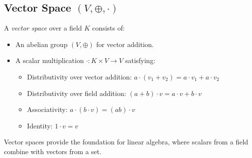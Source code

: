 \subsection{Vector Space \((V, \oplus, \cdot)\)}
A \emph{vector space} over a field \(K\) consists of:
\begin{itemize}[label=\(-\)]
  \item An abelian group \((V, \oplus)\) for vector addition.
  \item A scalar multiplication \(\cdot: K \times V \to V\) satisfying:
  \begin{itemize}
    \item Distributivity over vector addition: \(a \cdot (v_1 + v_2) = a \cdot v_1 + a \cdot v_2\)
    \item Distributivity over field addition: \((a + b) \cdot v = a \cdot v + b \cdot v\)
    \item Associativity: \(a \cdot (b \cdot v) = (ab) \cdot v\)
    \item Identity: \(1 \cdot v = v\)
  \end{itemize}
\end{itemize}
Vector spaces provide the foundation for linear algebra, where scalars from a field combine with vectors from a set.

\newpage
